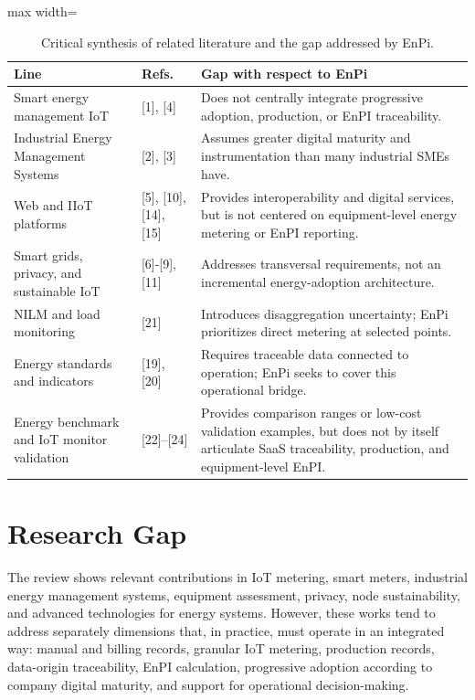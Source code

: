 \documentclass{ieeeaccess}
\begin{document}
\begin{table}[H]
\caption{Critical synthesis of related literature and the gap addressed by EnPi.}
\label{tab:sintesis-brecha}
\centering
\scriptsize
\begin{adjustbox}{max width=\columnwidth}
\begin{tabular}{p{}p{}p{}}
\toprule
Line & Refs. & Gap with respect to EnPi \\
\midrule
Smart energy management IoT & [1], [4] & Does not centrally integrate progressive adoption, production, or EnPI traceability. \\
Industrial Energy Management Systems & [2], [3] & Assumes greater digital maturity and instrumentation than many industrial SMEs have. \\
Web and IIoT platforms & [5], [10], [14], [15] & Provides interoperability and digital services, but is not centered on equipment-level energy metering or EnPI reporting. \\
Smart grids, privacy, and sustainable IoT & [6]-[9], [11] & Addresses transversal requirements, not an incremental energy-adoption architecture. \\
NILM and load monitoring & [21] & Introduces disaggregation uncertainty; EnPi prioritizes direct metering at selected points. \\
Energy standards and indicators & [19], [20] & Requires traceable data connected to operation; EnPi seeks to cover this operational bridge. \\
Energy benchmark and IoT monitor validation & [22]--[24] & Provides comparison ranges or low-cost validation examples, but does not by itself articulate SaaS traceability, production, and equipment-level EnPI. \\
\bottomrule
\end{tabular}
\end{adjustbox}
\end{table}

\section{Research Gap}
\label{sec:research-gap}

The review shows relevant contributions in IoT metering, smart meters, industrial energy management systems, equipment assessment, privacy, node sustainability, and advanced technologies for energy systems. However, these works tend to address separately dimensions that, in practice, must operate in an integrated way: manual and billing records, granular IoT metering, production records, data-origin traceability, EnPI calculation, progressive adoption according to company digital maturity, and support for operational decision-making.
\end{document}
